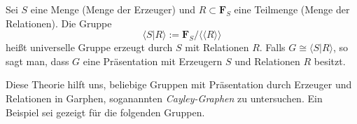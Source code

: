 \documentclass[11pt, a4paper]{article}
\begin{document}
\begin{definition} Sei $S$ eine Menge (Menge der Erzeuger) und $R\subset \mathbf F_S$ eine Teilmenge (Menge der Relationen). Die Gruppe 
$$\langle S| R\rangle := \mathbf{F}_S / \langle\!\langle R \rangle\!\rangle $$ heißt universelle Gruppe erzeugt durch $S$ mit Relationen $R$. Falls $G\cong \langle S| R\rangle$, so sagt man, dass $G$ eine Präsentation mit Erzeugern $S$ und Relationen $R$ besitzt.
    
\end{definition}
\newpage
\begin{note} Diese Theorie hilft uns, beliebige Gruppen mit Präsentation durch Erzeuger und Relationen in Garphen, soganannten \emph{Cayley-Graphen} zu untersuchen. Ein Beispiel sei gezeigt für die folgenden Gruppen. 
    

\begin{figure}[h] 
 \centering 
   \begin{subfigure}[b]{0.45\linewidth}
   \centering
\end{subfigure}
\end{figure}
\end{note}
\end{document}
